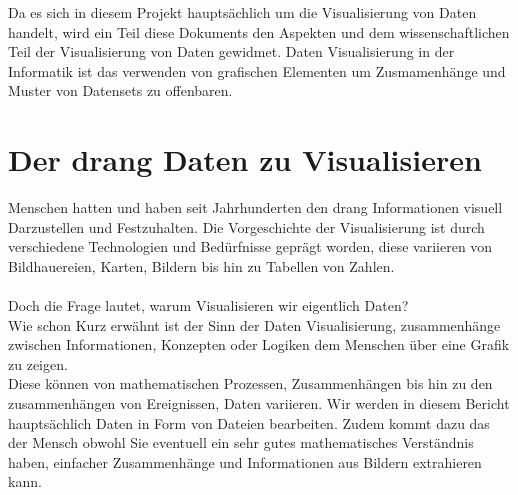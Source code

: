 
Da es sich in diesem Projekt hauptsächlich um die Visualisierung von Daten handelt, wird ein Teil diese Dokuments den Aspekten und dem
wissenschaftlichen Teil der Visualisierung von Daten gewidmet. Daten Visualisierung in der Informatik ist das verwenden von grafischen
Elementen um Zusmamenhänge und Muster von Datensets zu offenbaren.  

\section{Der drang Daten zu Visualisieren}
Menschen hatten und haben seit Jahrhunderten den drang Informationen visuell Darzustellen und Festzuhalten. Die Vorgeschichte der Visualisierung
ist durch verschiedene Technologien und Bedürfnisse geprägt worden, diese variieren von Bildhauereien, Karten, Bildern bis hin zu Tabellen
von Zahlen.\\ \\
Doch die Frage lautet, warum Visualisieren wir eigentlich Daten? \\
Wie schon Kurz erwähnt ist der Sinn der Daten Visualisierung, zusammenhänge zwischen Informationen, Konzepten oder Logiken dem Menschen über
eine Grafik zu zeigen.  \\
Diese können von mathematischen Prozessen, Zusammenhängen bis hin zu den zusammenhängen von Ereignissen, Daten variieren. Wir werden in diesem
Bericht hauptsächlich Daten in Form von Dateien bearbeiten. Zudem kommt dazu das der Mensch obwohl Sie eventuell ein sehr gutes
mathematisches Verständnis haben, einfacher Zusammenhänge und Informationen aus Bildern extrahieren kann. 

